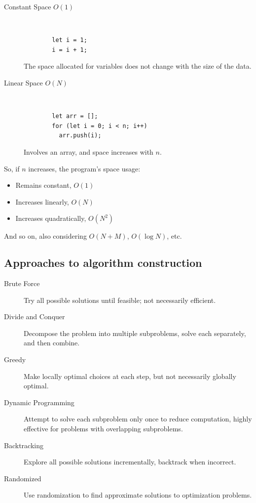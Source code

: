 \documentclass[11pt,journal,compsoc]{IEEEtran}
\begin{document}
\begin{description}
    \item[Constant Space \(O(1)\)] ~

    \begin{verbatim}
        let i = 1;
        i = i + 1;
    \end{verbatim}

    The space allocated for variables does not change with the size of the data.

    \item[Linear Space \(O(N)\)] ~

    \begin{verbatim}
        let arr = [];
        for (let i = 0; i < n; i++)
          arr.push(i);
    \end{verbatim}

    Involves an array, and space increases with \(n\).
\end{description}

So, if \(n\) increases, the program's space usage:

\begin{itemize}
    \item Remains constant, \(O(1)\)

    \item Increases linearly, \(O(N)\)

    \item Increases quadratically, \(O(N^2)\)

\end{itemize}

And so on, also considering \(O(N + M)\), \(O(\log N)\), etc.


\subsection{Approaches to algorithm construction}

\begin{description}
    \item[Brute Force] Try all possible solutions until feasible; not necessarily efficient.
    
    \item[Divide and Conquer] Decompose the problem into multiple subproblems, solve each separately, and then combine.
    
    \item[Greedy] Make locally optimal choices at each step, but not necessarily globally optimal.
    
    \item[Dynamic Programming] Attempt to solve each subproblem only once to reduce computation, highly effective for problems with overlapping subproblems.
    
    \item[Backtracking] Explore all possible solutions incrementally, backtrack when incorrect.
    
    \item[Randomized] Use randomization to find approximate solutions to optimization problems.
\end{description}
\end{document}
